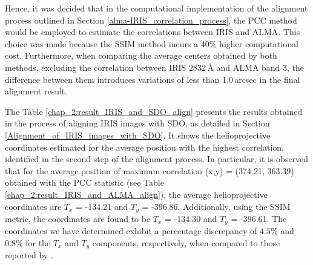 \documentclass[a4paper,alpha-refs]{eSpectra}
\begin{document}
Hence, it was decided that in the computational implementation of the alignment process outlined in Section \ref{alma-IRIS_correlation_process}, the PCC method would be employed to estimate the correlations between IRIS and ALMA. This choice was made because the SSIM method incurs a 40\% higher computational cost. Furthermore, when comparing the average centers obtained by both methods, excluding the correlation between IRIS 2832\,Å and ALMA band 3, the difference between them introduces variations of less than 1.0\,arcsec in the final alignment result.









The Table \ref{chap_2:result_IRIS_and_SDO_align} presents the results obtained in the process of aligning IRIS images with SDO, as detailed in Section \ref{Alignment_of_IRIS_images_with_SDO}. It shows the helioprojective coordinates estimated for the average position with the highest correlation, identified in the second step of the alignment process. 
In particular, it is observed that for the average position of maximum correlation (x,y) = (374.21, 363.39) obtained with the PCC statistic (see Table \ref{chap_2:result_IRIS_and_ALMA_align}), the average helioprojective coordinates are $T_x$ = -134.21 and $T_y$ = -396.86. Additionally, using the SSIM metric, the coordinates are found to be $T_x$ = -134.30 and $T_y$ = -396.61. The coordinates we have determined exhibit a percentage discrepancy of $4.5\%$ and $0.8\%$ for the $T_x$ and $T_y$ components, respectively, when compared to those reported by \cite{SALSA_guia}. 
\end{document}
